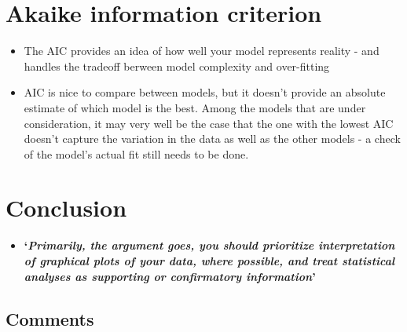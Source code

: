 \documentclass[
]{book}
\providecommand{\tightlist}{%
  \setlength{\itemsep}{0pt}\setlength{\parskip}{0pt}}
\begin{document}
\hypertarget{akaike-information-criterion}{%
\section{Akaike information criterion}\label{akaike-information-criterion}}

\begin{itemize}
\tightlist
\item
  The AIC provides an idea of how well your model represents reality - and handles the tradeoff berween model complexity and over-fitting
\item
  AIC is nice to compare between models, but it doesn't provide an absolute estimate of which model is the best. Among the models that are under consideration, it may very well be the case that the one with the lowest AIC doesn't capture the variation in the data as well as the other models - a check of the model's actual fit still needs to be done.
\end{itemize}

\hypertarget{conclusion}{%
\section{Conclusion}\label{conclusion}}

\begin{itemize}
\tightlist
\item
  \textbf{`\emph{Primarily, the argument goes, you should prioritize interpretation of graphical plots of your data, where possible, and treat statistical analyses as supporting or confirmatory information}'}
\end{itemize}

\hypertarget{comments}{%
\subsection{Comments}\label{comments}}
\end{document}
